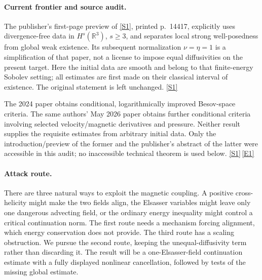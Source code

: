\documentclass[11pt,a4paper]{article}
\newcommand{\R}{\mathbb{R}}
\newcommand{\sref}[2]{\hyperlink{source:#1:#2}{[S#2]}}
\newcommand{\eref}[2]{\hyperlink{extra:#1:#2}{[E#2]}}
\numberwithin{equation}{section}
\begin{document}
\paragraph{Current frontier and source audit.}
The publisher's first-page preview of \sref{statement}{1}, printed p.~14417,
explicitly uses divergence-free data in $H^s(\R^3)$, $s\geq3$, and separates
local strong well-posedness from global weak existence. Its subsequent
normalization $\nu=\eta=1$ is a simplification of that paper, not a license
to impose equal diffusivities on the present target. Here the initial data
are smooth and belong to that finite-energy Sobolev setting; all estimates
are first made on their classical interval of existence. The original
statement is left unchanged. \sref{statement}{1}

The 2024 paper obtains conditional, logarithmically improved Besov-space
criteria. The same authors' May 2026 paper obtains further conditional
criteria involving selected velocity/magnetic derivatives and pressure.
Neither result supplies the requisite estimates from arbitrary initial
data. Only the introduction/preview of the former and the publisher's
abstract of the latter were accessible in this audit; no inaccessible
technical theorem is used below. \sref{statement}{1}\,\eref{statement}{1}

\paragraph{Attack route.}
There are three natural ways to exploit the magnetic coupling. A positive
cross-helicity might make the two fields align, the Elsasser variables might
leave only one dangerous advecting field, or the ordinary energy inequality
might control a critical continuation norm. The first route needs a
mechanism forcing alignment, which energy conservation does not provide.
The third route has a scaling obstruction. We pursue the second route,
keeping the unequal-diffusivity term rather than discarding it. The result
will be a one-Elsasser-field continuation estimate with a fully displayed
nonlinear cancellation, followed by tests of the missing global estimate.
\end{document}

